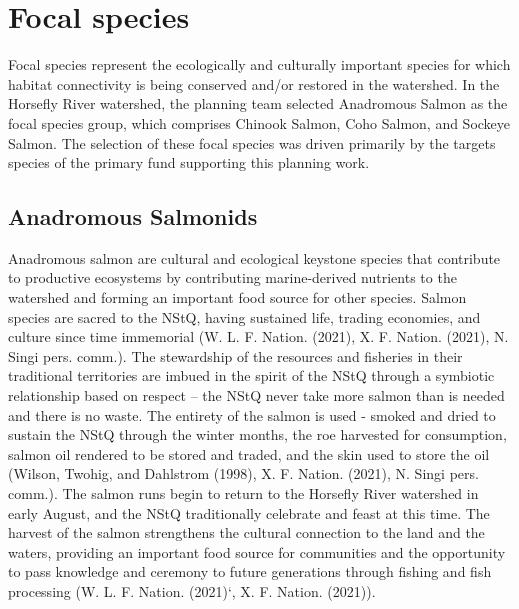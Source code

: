 \documentclass[
  letterpaper,
  DIV=11,
  numbers=noendperiod]{scrreprt}
\begin{document}
\section*{Focal species}\label{focal-species}


Focal species represent the ecologically and culturally important
species for which habitat connectivity is being conserved and/or
restored in the watershed. In the Horsefly River watershed, the planning
team selected Anadromous Salmon as the focal species group, which
comprises Chinook Salmon, Coho Salmon, and Sockeye Salmon. The selection
of these focal species was driven primarily by the targets species of
the primary fund supporting this planning work.

\subsection*{Anadromous Salmonids}\label{anadromous-salmonids}

Anadromous salmon are cultural and ecological keystone species that
contribute to productive ecosystems by contributing marine-derived
nutrients to the watershed and forming an important food source for
other species. Salmon species are sacred to the NStQ, having sustained
life, trading economies, and culture since time immemorial (W. L. F.
Nation. (2021), X. F. Nation. (2021), N. Singi pers. comm.). The
stewardship of the resources and fisheries in their traditional
territories are imbued in the spirit of the NStQ through a symbiotic
relationship based on respect -- the NStQ never take more salmon than is
needed and there is no waste. The entirety of the salmon is used -
smoked and dried to sustain the NStQ through the winter months, the roe
harvested for consumption, salmon oil rendered to be stored and traded,
and the skin used to store the oil (Wilson, Twohig, and Dahlstrom
(1998), X. F. Nation. (2021), N. Singi pers. comm.). The salmon runs
begin to return to the Horsefly River watershed in early August, and the
NStQ traditionally celebrate and feast at this time. The harvest of the
salmon strengthens the cultural connection to the land and the waters,
providing an important food source for communities and the opportunity
to pass knowledge and ceremony to future generations through fishing and
fish processing (W. L. F. Nation. (2021)`, X. F. Nation. (2021)).
\end{document}
